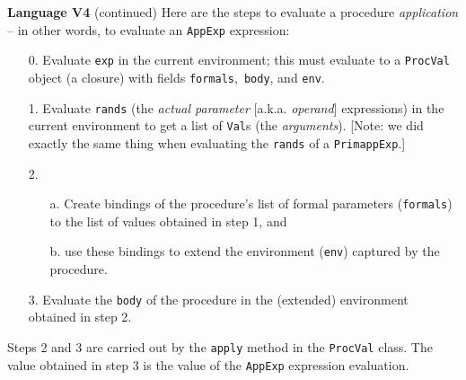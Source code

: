 \begin{minipage}[t]{\sw}
\slidenumber
\LARGE
{\bf Language V4} (continued)\exx
\Large
\emm{}\exx
\LARGE
Here are the steps to evaluate a procedure {\em application} --
in other words, to evaluate an \verb'AppExp' expression:
\begin{enumerate}
\item[0.]
    Evaluate \verb'exp' in the current environment;
    this must evaluate to a \verb'ProcVal' object (a closure)
    with fields \verb'formals',\ \verb'body', and \verb'env'.
\item[1.]
    Evaluate \verb'rands'
    (the {\em actual parameter} [a.k.a. {\em operand}] expressions)
    in the current environment
    to get a list of \verb'Val's (the {\em arguments}).
    [Note: we did exactly the same thing when evaluating the \verb'rands' 
    of a \verb'PrimappExp'.]
\item[2.]
    \begin{enumerate}
    \item[a.]
    Create bindings of the procedure's
    list of formal parameters (\verb'formals')
    to the list of values obtained in step 1, and
    \item[b.]
    use these bindings to extend the environment (\verb'env')
    captured by the procedure.
    \end{enumerate}
\item[3.]
    Evaluate the \verb'body' of the procedure
    in the (extended) environment obtained in step 2.
\end{enumerate}
Steps 2 and 3 are carried out by the \verb'apply' method
in the \verb'ProcVal' class.
The value obtained in step 3 is the value
of the \verb'AppExp' expression evaluation.
\end{minipage}
\clearpage
